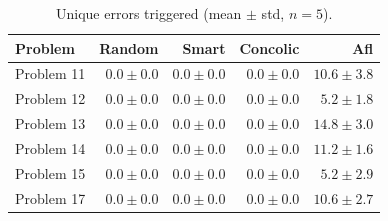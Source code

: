 \begin{table}[h]
    \centering
    \caption{Unique errors triggered (mean $\pm$ std, $n=5$).}
    \label{tab:task2-errors}
    \begin{tabular}{lrrrr}
        \toprule
        Problem & \textbf{Random} & \textbf{Smart} & \textbf{Concolic} & \textbf{Afl} \\
        \midrule
        Problem 11 & $0.0 \pm 0.0$ & $0.0 \pm 0.0$ & $0.0 \pm 0.0$ & $10.6 \pm 3.8$ \\
        Problem 12 & $0.0 \pm 0.0$ & $0.0 \pm 0.0$ & $0.0 \pm 0.0$ & $5.2 \pm 1.8$ \\
        Problem 13 & $0.0 \pm 0.0$ & $0.0 \pm 0.0$ & $0.0 \pm 0.0$ & $14.8 \pm 3.0$ \\
        Problem 14 & $0.0 \pm 0.0$ & $0.0 \pm 0.0$ & $0.0 \pm 0.0$ & $11.2 \pm 1.6$ \\
        Problem 15 & $0.0 \pm 0.0$ & $0.0 \pm 0.0$ & $0.0 \pm 0.0$ & $5.2 \pm 2.9$ \\
        Problem 17 & $0.0 \pm 0.0$ & $0.0 \pm 0.0$ & $0.0 \pm 0.0$ & $10.6 \pm 2.7$ \\
        \bottomrule
    \end{tabular}
\end{table}